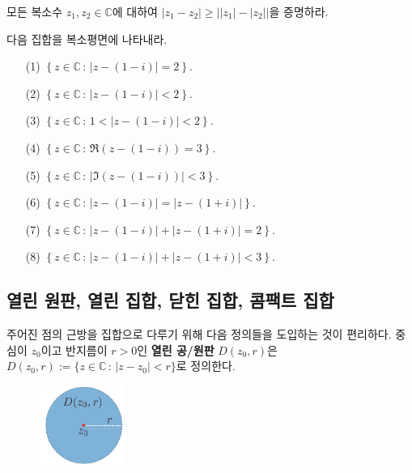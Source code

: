\begin{salt_exercise} \label{ex-1-22}
모든 복소수 $z_1, z_2\in \mathbb C$에 대하여
$|z_1-z_2| \ge \big| |z_1| - |z_2| \big|$을 증명하라.
\end{salt_exercise}

\begin{salt_exercise} \label{ex-1-23}
다음 집합을 복소평면에 나타내라.
\begin{itemize}
\item[(1)] $\left\{z\in\mathbb C\,:\, |z-(1-i)| = 2 \right\}$.
\item[(2)] $\left\{z\in\mathbb C\,:\, |z-(1-i)| < 2 \right\}$.
\item[(3)] $\left\{z\in\mathbb C\,:\, 1< |z-(1-i)| < 2 \right\}$.
\item[(4)] $\left\{z\in\mathbb C\,:\, \Re(z-(1-i)) = 3 \right\}$.
\item[(5)] $\left\{z\in\mathbb C\,:\, |\Im(z-(1-i))| < 3 \right\}$.
\item[(6)] $\left\{z\in\mathbb C\,:\, |z-(1-i)| = |z-(1+i)| \right\}$.
\item[(7)] $\left\{z\in\mathbb C\,:\, |z-(1-i)| + |z-(1+i)| = 2 \right\}$.
\item[(8)] $\left\{z\in\mathbb C\,:\, |z-(1-i)| + |z-(1+i)| < 3 \right\}$.
\end{itemize}
\end{salt_exercise}

\subsection{열린 원판, 열린 집합, 닫힌 집합, 콤팩트 집합}

주어진 점의 근방을 집합으로 다루기 위해 다음 정의들을 도입하는 것이 편리하다.
중심이 $z_0$이고 반지름이 $r>0$인 {\bf 열린 공/원판} $D(z_0,r)$은 
$D(z_0,r) :=\{ z\in\mathbb C \,:\, |z-z_0| <r \}$로 정의한다.

\begin{figure}[!h]
\begin{center}
\includegraphics[width=0.25\textwidth]{./SaltChapter/figs/fig-1-0-1}
\end{center}
\end{figure}

